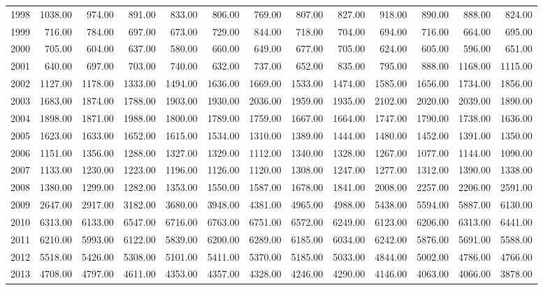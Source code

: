 \begin{longtable}{rrrrrrrrrrrrr}
  1998 & 1038.00 & 974.00 & 891.00 & 833.00 & 806.00 & 769.00 & 807.00 & 827.00 & 918.00 & 890.00 & 888.00 & 824.00 \\ 
  1999 & 716.00 & 784.00 & 697.00 & 673.00 & 729.00 & 844.00 & 718.00 & 704.00 & 694.00 & 716.00 & 664.00 & 695.00 \\ 
  2000 & 705.00 & 604.00 & 637.00 & 580.00 & 660.00 & 649.00 & 677.00 & 705.00 & 624.00 & 605.00 & 596.00 & 651.00 \\ 
  2001 & 640.00 & 697.00 & 703.00 & 740.00 & 632.00 & 737.00 & 652.00 & 835.00 & 795.00 & 888.00 & 1168.00 & 1115.00 \\ 
  2002 & 1127.00 & 1178.00 & 1333.00 & 1494.00 & 1636.00 & 1669.00 & 1533.00 & 1474.00 & 1585.00 & 1656.00 & 1734.00 & 1856.00 \\ 
  2003 & 1683.00 & 1874.00 & 1788.00 & 1903.00 & 1930.00 & 2036.00 & 1959.00 & 1935.00 & 2102.00 & 2020.00 & 2039.00 & 1890.00 \\ 
  2004 & 1898.00 & 1871.00 & 1988.00 & 1800.00 & 1789.00 & 1759.00 & 1667.00 & 1664.00 & 1747.00 & 1790.00 & 1738.00 & 1636.00 \\ 
  2005 & 1623.00 & 1633.00 & 1652.00 & 1615.00 & 1534.00 & 1310.00 & 1389.00 & 1444.00 & 1480.00 & 1452.00 & 1391.00 & 1350.00 \\ 
  2006 & 1151.00 & 1356.00 & 1288.00 & 1327.00 & 1329.00 & 1112.00 & 1340.00 & 1328.00 & 1267.00 & 1077.00 & 1144.00 & 1090.00 \\ 
  2007 & 1133.00 & 1230.00 & 1223.00 & 1196.00 & 1126.00 & 1120.00 & 1308.00 & 1247.00 & 1277.00 & 1312.00 & 1390.00 & 1338.00 \\ 
  2008 & 1380.00 & 1299.00 & 1282.00 & 1353.00 & 1550.00 & 1587.00 & 1678.00 & 1841.00 & 2008.00 & 2257.00 & 2206.00 & 2591.00 \\ 
  2009 & 2647.00 & 2917.00 & 3182.00 & 3680.00 & 3948.00 & 4381.00 & 4965.00 & 4988.00 & 5438.00 & 5594.00 & 5887.00 & 6130.00 \\ 
  2010 & 6313.00 & 6133.00 & 6547.00 & 6716.00 & 6763.00 & 6751.00 & 6572.00 & 6249.00 & 6123.00 & 6206.00 & 6313.00 & 6441.00 \\ 
  2011 & 6210.00 & 5993.00 & 6122.00 & 5839.00 & 6200.00 & 6289.00 & 6185.00 & 6034.00 & 6242.00 & 5876.00 & 5691.00 & 5588.00 \\ 
  2012 & 5518.00 & 5426.00 & 5308.00 & 5101.00 & 5411.00 & 5370.00 & 5185.00 & 5033.00 & 4844.00 & 5002.00 & 4786.00 & 4766.00 \\ 
  2013 & 4708.00 & 4797.00 & 4611.00 & 4353.00 & 4357.00 & 4328.00 & 4246.00 & 4290.00 & 4146.00 & 4063.00 & 4066.00 & 3878.00 \\ 

\end{longtable}
